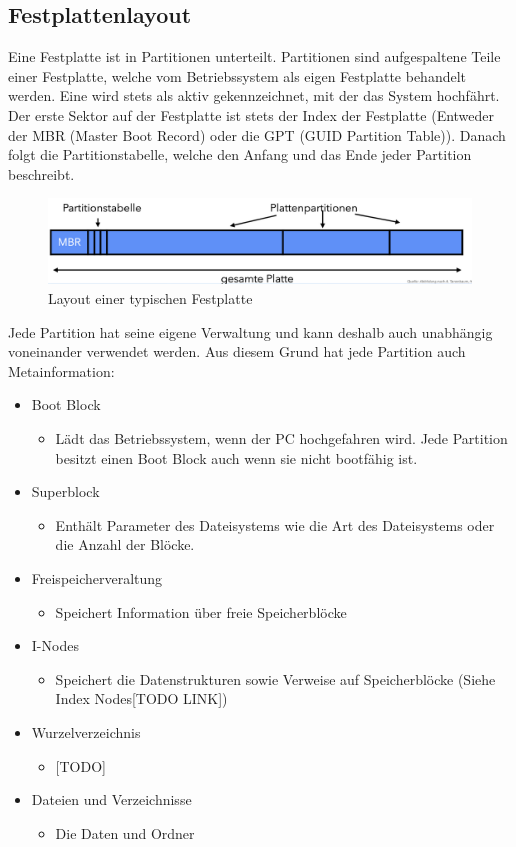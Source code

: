 \documentclass{article}
\begin{document}
	\subsection{Festplattenlayout}
	Eine Festplatte ist in Partitionen unterteilt. Partitionen sind aufgespaltene Teile einer Festplatte, welche vom Betriebssystem als eigen Festplatte behandelt werden. Eine wird stets als aktiv gekennzeichnet, mit der das System hochfährt. \\
	Der erste Sektor auf der Festplatte ist stets der Index der Festplatte (Entweder der MBR (Master Boot Record) oder die GPT (GUID Partition Table)). Danach folgt die Partitionstabelle, welche den Anfang und das Ende jeder Partition beschreibt. 
	\begin{figure}[H]
	\centering
	\includegraphics[scale=0.4]{Bilder/partition.png}
	\caption{Layout einer typischen Festplatte}
	\end{figure}
	Jede Partition hat seine eigene Verwaltung und kann deshalb auch unabhängig voneinander verwendet werden. Aus diesem Grund hat jede Partition auch Metainformation: \\
	\begin{itemize}
		\item{Boot Block}
		\begin{itemize}
			\item{Lädt das Betriebssystem, wenn der PC hochgefahren wird. Jede Partition besitzt einen Boot Block auch wenn sie nicht bootfähig ist.}
		\end{itemize}
		\item{Superblock}
		\begin{itemize}
			\item{Enthält Parameter des Dateisystems wie die Art des Dateisystems oder die Anzahl der Blöcke.}
		\end{itemize}
		\item{Freispeicherveraltung}
		\begin{itemize}
			\item{Speichert Information über freie Speicherblöcke}
		\end{itemize}
		\item{I-Nodes}
		\begin{itemize}
			\item{Speichert die Datenstrukturen sowie Verweise auf Speicherblöcke (Siehe Index Nodes[TODO LINK])}
		\end{itemize}
		\item{Wurzelverzeichnis}
		\begin{itemize}
			\item{[TODO]}
		\end{itemize}
		\item{Dateien und Verzeichnisse}
		\begin{itemize}
			\item{Die Daten und Ordner}
		\end{itemize}
	\end{itemize}
\end{document}
